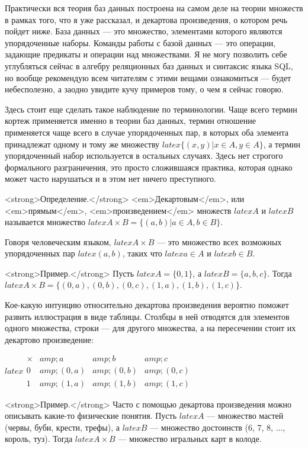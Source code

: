 Практически вся теория баз данных построена на самом деле на теории множеств в рамках того, что я уже рассказал, и декартова произведения, о котором речь пойдет ниже. База данных — это множество, элементами которого являются упорядоченные наборы. Команды работы с базой данных — это операции, задающие предикаты и операции над множествами. Я не могу позволить себе углубляться сейчас в алгебру реляционных баз данных и синтаксис языка SQL, но вообще рекомендую всем читателям с этими вещами ознакомиться — будет небесполезно, а заодно увидите кучу примеров тому, о чем я сейчас говорю.

Здесь стоит еще сделать такое наблюдение по терминологии. Чаще всего термин кортеж применяется именно в теории баз данных, термин отношение применяется чаще всего в случае упорядоченных пар, в которых оба элемента принадлежат одному и тому же множеству $latex \{(x, y)|x\in A, y\in A\}$, а термин упорядоченный набор используется в остальных случаях. Здесь нет строгого формального разграничения, это просто сложившаяся практика, которая однако может часто нарушаться и в этом нет ничего преступного.

<strong>Определение.</strong> <em>Декартовым</em>, или <em>прямым</em>, <em>произведением</em> множеств $latex A$ и $latex B$ называется множество $latex A\times B = \{(a, b)|a\in A, b\in B\}$.

Говоря человеческим языком, $latex A\times B$ — это множество всех возможных упорядоченных пар $latex (a, b)$, таких что $latex a\in A$ и $latex b \in B$.

<strong>Пример.</strong> Пусть $latex A = \{0, 1\}$, а $latex B = \{a, b, c\}$. Тогда $latex A\times B = \{(0, a), (0, b), (0, c), (1, a), (1, b), (1, c)\}$.

Кое-какую интуицию относительно декартова произведения вероятно поможет развить иллюстрация в виде таблицы. Столбцы в ней отводятся для элементов одного множества, строки — для другого множества, а на пересечении стоит их декартово произведение:

$latex \begin{array}{c|ccc}\times &amp; a&amp;b&amp;c\\ \hline 0 &amp; (0,a) &amp; (0, b) &amp; (0, c) \\ 1 &amp; (1, a)&amp; (1, b) &amp;(1, c)\end{array}$

<strong>Пример.</strong> Часто с помощью декартова произведения можно описывать какие-то физические понятия. Пусть $latex A$ — множество мастей (червы, буби, крести, трефы), а $latex B$ — множество достоинств (6, 7, 8, ..., король, туз). Тогда $latex A \times B$ — множество игральных карт в колоде.

